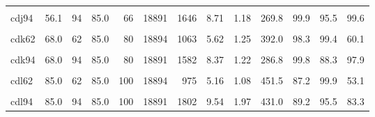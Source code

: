 \begin{landscape}
\begin{longtable}[t]{lrrrrrrrrrrrr}
\cellcolor{gray!6}{cdj78} & \cellcolor{gray!6}{56.1} & \cellcolor{gray!6}{78} & \cellcolor{gray!6}{85.0} & \cellcolor{gray!6}{66} & \cellcolor{gray!6}{18893} & \cellcolor{gray!6}{1205} & \cellcolor{gray!6}{6.38} & \cellcolor{gray!6}{1.22} & \cellcolor{gray!6}{287.1} & \cellcolor{gray!6}{99.9} & \cellcolor{gray!6}{92.4} & \cellcolor{gray!6}{98.7}\\
cdj94 & 56.1 & 94 & 85.0 & 66 & 18891 & 1646 & 8.71 & 1.18 & 269.8 & 99.9 & 95.5 & 99.6\\
\cellcolor{gray!6}{cdk46} & \cellcolor{gray!6}{68.0} & \cellcolor{gray!6}{46} & \cellcolor{gray!6}{85.0} & \cellcolor{gray!6}{80} & \cellcolor{gray!6}{18891} & \cellcolor{gray!6}{1241} & \cellcolor{gray!6}{6.57} & \cellcolor{gray!6}{1.25} & \cellcolor{gray!6}{371.3} & \cellcolor{gray!6}{99.9} & \cellcolor{gray!6}{99.6} & \cellcolor{gray!6}{88.6}\\
cdk62 & 68.0 & 62 & 85.0 & 80 & 18894 & 1063 & 5.62 & 1.25 & 392.0 & 98.3 & 99.4 & 60.1\\
\cellcolor{gray!6}{cdk78} & \cellcolor{gray!6}{68.0} & \cellcolor{gray!6}{78} & \cellcolor{gray!6}{85.0} & \cellcolor{gray!6}{80} & \cellcolor{gray!6}{18891} & \cellcolor{gray!6}{1148} & \cellcolor{gray!6}{6.07} & \cellcolor{gray!6}{1.32} & \cellcolor{gray!6}{362.2} & \cellcolor{gray!6}{99.3} & \cellcolor{gray!6}{97.3} & \cellcolor{gray!6}{98.0}\\
cdk94 & 68.0 & 94 & 85.0 & 80 & 18891 & 1582 & 8.37 & 1.22 & 286.8 & 99.8 & 88.3 & 97.9\\
\cellcolor{gray!6}{cdl46} & \cellcolor{gray!6}{85.0} & \cellcolor{gray!6}{46} & \cellcolor{gray!6}{85.0} & \cellcolor{gray!6}{100} & \cellcolor{gray!6}{18891} & \cellcolor{gray!6}{720} & \cellcolor{gray!6}{3.81} & \cellcolor{gray!6}{1.15} & \cellcolor{gray!6}{353.6} & \cellcolor{gray!6}{80.4} & \cellcolor{gray!6}{99.7} & \cellcolor{gray!6}{55.2}\\
cdl62 & 85.0 & 62 & 85.0 & 100 & 18894 & 975 & 5.16 & 1.08 & 451.5 & 87.2 & 99.9 & 53.1\\
\cellcolor{gray!6}{cdl78} & \cellcolor{gray!6}{85.0} & \cellcolor{gray!6}{78} & \cellcolor{gray!6}{85.0} & \cellcolor{gray!6}{100} & \cellcolor{gray!6}{18894} & \cellcolor{gray!6}{1407} & \cellcolor{gray!6}{7.45} & \cellcolor{gray!6}{1.75} & \cellcolor{gray!6}{471.3} & \cellcolor{gray!6}{95.0} & \cellcolor{gray!6}{99.4} & \cellcolor{gray!6}{82.2}\\
cdl94 & 85.0 & 94 & 85.0 & 100 & 18891 & 1802 & 9.54 & 1.97 & 431.0 & 89.2 & 95.5 & 83.3\\

\end{longtable}
\end{landscape}
